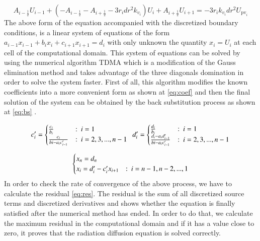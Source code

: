\documentclass{warpdoc}
\begin{document}
\begin{equation}
    A_{i-\frac{1}{2}}U_{i-1}+\left(-A_{i-\frac{1}{2}}-A_{i+\frac{1}{2}}-3r_idr^2k_{v_i}\right)U_i+A_{i+\frac{1}{2}}U_{i+1}=-3r_ik_{v_i}dr^2U_{\text{pv}_i}\label{eq:disc2}
\end{equation}
The above form of the equation accompanied with the discretized boundary conditions, is a linear system of equations of the form $a_{i-1}x_{i-1}+b_ix_i+c_{i+1}x_{i+1}=d_i$ with only unknown the quantity $x_i=U_i$ at each cell of the computational domain. This system of equations can be solved by using the numerical algorithm TDMA which is a modification of the Gauss elimination method and takes advantage of the three diagonals domination in order to solve the system faster. First of all, this algorithm modifies the known coefficients into a more convenient form as shown at \eqref{eq:coef} and then the final solution of the system can be obtained by the back substitution process as shown at \eqref{eq:bs} . 


\begingroup
\large
\begin{equation}
\displaystyle c_i' = \begin{cases} 
      \frac{c_i}{b_i} & \text{:\enspace $i=1$} \\
      \frac{c_i}{bi-a_ic_{i-1}'} & \text{:\enspace $i=2,3,...,n-1$} \\ 
   \end{cases}
   \displaystyle \enspace d_i' = \begin{cases}
      \frac{d_i}{b_i} & \text{:\enspace $i=1$} \\
      \frac{d_i-a_id_{i-1}'}{bi-a_ic_{i-1}'} & \text{:\enspace $i=2,3,...,n-1$} \\
   \end{cases}
   \label{eq:coef}
\end{equation}
\endgroup

\vspace{10mm}

\begingroup
\large
\begin{equation}
\begin{cases} 
     x_n=d_n \\
     x_i=d_i'-c_i'x_{i+1} & \text{:\enspace $i=n-1,n-2,...,1$} \\
   \end{cases}
      \label{eq:bs}
\end{equation}
\endgroup
In order to check the rate of convergence of the above process, we have to calculate the residual \eqref{eq:res}. The residual is the sum  of all discretized source terms and discretized derivatives and shows whether the equation is finally satisfied after the numerical method has ended. In order to do that, we calculate the maximum residual in the computational domain and if it has a value close to zero, it proves that the radiation diffusion equation is solved correctly. 
\end{document}

